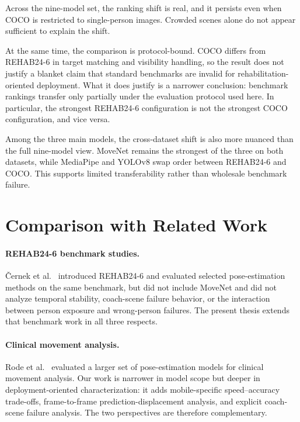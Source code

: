 Across the nine-model set, the ranking shift is real, and it persists even when COCO is restricted to single-person images. Crowded scenes alone do not appear sufficient to explain the shift.

At the same time, the comparison is protocol-bound. COCO differs from REHAB24-6 in target matching and visibility handling, so the result does not justify a blanket claim that standard benchmarks are invalid for rehabilitation-oriented deployment. What it does justify is a narrower conclusion: benchmark rankings transfer only partially under the evaluation protocol used here. In particular, the strongest REHAB24-6 configuration is not the strongest COCO configuration, and vice versa.

Among the three main models, the cross-dataset shift is also more nuanced than the full nine-model view. MoveNet remains the strongest of the three on both datasets, while MediaPipe and YOLOv8 swap order between REHAB24-6 and COCO. This supports limited transferability rather than wholesale benchmark failure.


\section{Comparison with Related Work}
\label{sec:literature-comparison}

\paragraph{REHAB24-6 benchmark studies.}
\v{C}ernek et al.~\cite{cernek2025rehab246} introduced REHAB24-6 and evaluated selected pose-estimation methods on the same benchmark, but did not include MoveNet and did not analyze temporal stability, coach-scene failure behavior, or the interaction between person exposure and wrong-person failures. The present thesis extends that benchmark work in all three respects.

\paragraph{Clinical movement analysis.}
Rode et al.~\cite{rode2025assessment} evaluated a larger set of pose-estimation models for clinical movement analysis. Our work is narrower in model scope but deeper in deployment-oriented characterization: it adds mobile-specific speed--accuracy trade-offs, frame-to-frame prediction-displacement analysis, and explicit coach-scene failure analysis. The two perspectives are therefore complementary.

